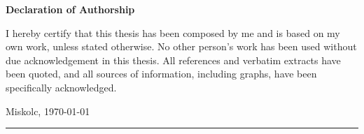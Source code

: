 \documentclass[13pt, a4paper, oneside]{Thesis} %
\begin{document}
\thispagestyle{empty}
{}
\onehalfspacing
\begin{center}{\huge\bf Declaration    of    Authorship\par}\end{center}
I hereby certify that this thesis has been composed by me and is based on my
own work, unless stated otherwise. No other person’s work has been used without
due acknowledgement in this thesis. All references and verbatim extracts have
been quoted, and all sources of information, including graphs, have been specifically
acknowledged.


Miskolc, \today \\

\vspace{2cm}
\begin{minipage}{0.4\textwidth}
\begin{center}
\rule{5cm}{0.5mm} \\
\authornames
\end{center}
\end{minipage}

\clearpage %

\tableofcontents
\newpage
\onehalfspacing





\appendix


\end{document}
